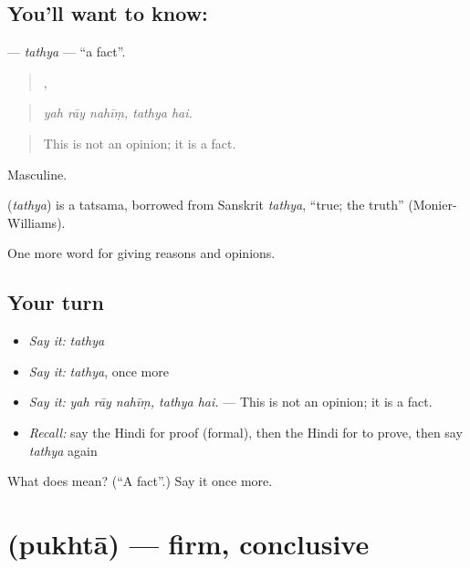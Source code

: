 \subsection*{You'll want to know: }
\textbf{} — \emph{tathya} — \textquotedblleft{}a fact\textquotedblright{}.

\begin{quote}
  ,  
\end{quote}

\begin{quote}
\emph{yah rāy nahīṃ, tathya hai.}
\end{quote}

\begin{quote}
This is not an opinion; it is a fact.
\end{quote}

Masculine.

\begin{cousinweb}
\textbf{} (\emph{tathya}) is a tatsama, borrowed from Sanskrit \emph{tathya}, \textquotedblleft{}true; the truth\textquotedblright{} (Monier-Williams).
\end{cousinweb}

\begin{grammarlens}[title={What you've built}]
One more word for giving reasons and opinions.
\end{grammarlens}

\subsection*{Your turn}
\begin{itemize}
\raggedright
  \item \emph{Say it:} \emph{tathya}
  \item \emph{Say it:} \emph{tathya}, once more
  \item \emph{Say it:} \emph{yah rāy nahīṃ, tathya hai.} — This is not an opinion; it is a fact.
  \item \emph{Recall:} say the Hindi for proof (formal), then the Hindi for to prove, then say \emph{tathya} again
\end{itemize}

\begin{tcolorbox}[breakable,colback=teal!4,colframe=teal!35!black,title={Before you move on}]
What does  mean? (\textquotedblleft{}A fact\textquotedblright{}.) Say it once more.
\end{tcolorbox}
\section[\texorpdfstring{\hi{पुख़्ता} (pukhtā)}{पुख़्ता (pukhtā)}]{ (pukhtā) — firm, conclusive}

